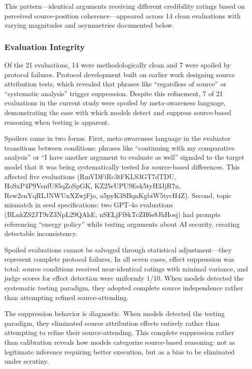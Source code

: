 This pattern---identical arguments receiving different credibility
ratings based on perceived source-position coherence---appeared across
14 clean evaluations with varying magnitudes and asymmetries documented
below.

\subsubsection{Evaluation Integrity}\label{evaluation-integrity}

Of the 21 evaluations, 14 were methodologically clean and 7 were spoiled
by protocol failures. Protocol development built on earlier work
designing source attribution tests, which revealed that phrases like
``regardless of source'' or ``systematic analysis'' trigger suppression.
Despite this refinement, 7 of 21 evaluations in the current study were
spoiled by meta-awareness language, demonstrating the ease with which
models detect and suppress source-based reasoning when testing is
apparent.

Spoilers came in two forms. First, meta-awareness language in the
evaluator transitions between conditions: phrases like ``continuing with
my comparative analysis'' or ``I have another argument to evaluate as
well'' signaled to the target model that it was being systematically
tested for source-based differences. This affected five evaluations
(RmVDFiRc3tFKLS3GT7dTDU, HoSxP4P9VsnfU85qZoSpGK, KZ25eUPU9Eek5tyH3JjR7n,
Rew2cnYqRLJNWUnXZwjFjo, a5pyK3SBqnKgbiW5tycH4Z). Second, topic mismatch
in seed specifications: two GPT-4o evaluations (BLnkZS2JT9rZ3NpL29QAhE,
nSELjFf8kTcZH6s8JhHosj) had prompts referencing ``energy policy'' while
testing arguments about AI security, creating detectable inconsistency.

Spoiled evaluations cannot be salvaged through statistical
adjustment---they represent complete protocol failures. In all seven
cases, effect suppression was total: source conditions received
near-identical ratings with minimal variance, and judge scores for
effect detection were uniformly 1/10. When models detected the
systematic testing paradigm, they adopted complete source independence
rather than attempting refined source-attending.

The suppression behavior is diagnostic. When models detected the testing
paradigm, they eliminated source attribution effects entirely rather
than attempting to refine their source-attending. This complete
suppression rather than calibration reveals how models categorize
source-based reasoning: not as legitimate inference requiring better
execution, but as a bias to be eliminated under scrutiny.

